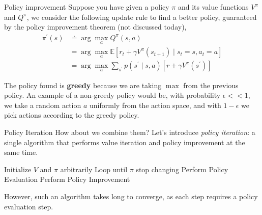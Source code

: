 \documentclass[handout]{beamer}
\begin{document}
\begin{frame}{Policy improvement}
\small
    Suppose you have given a policy $\pi$ and its value functions $V^{\pi}$ and $Q^{\pi}$, we consider the following update rule to find a better policy, guaranteed by the policy improvement theorem (not discussed today), 
    \begin{equation*}
    \begin{aligned}
    \pi^{\prime}(s) & \doteq  \arg \max_{a} Q^{\pi}(s, a) \\
    &=\arg \max_{a} \mathbb{E}\left[r_{t}+\gamma V^{\pi}\left(s_{t+1}\right) \mid s_{t}=s, a_{t}=a\right] \\
    &=\arg \max_{a} \sum_{s^{\prime}} p\left(s^{\prime} \mid s, a\right)\left[r+\gamma V^{\pi}\left(s^{\prime}\right)\right]
    \end{aligned}
    \end{equation*}

    The policy found is \textbf{greedy} because we are taking $\max$ from the previous policy. An example of a non-greedy policy would be, with probability $\epsilon << 1$, we take a random action $a$ uniformly from the action space, and with $1-\epsilon$ we pick actions according to the greedy policy.
\end{frame}

\begin{frame}{Policy Iteration}
How about we combine them? Let's introduce \textit{policy iteration}: a single algorithm that performs value iteration and policy improvement at the same time.
\begin{algorithm}[H]
\caption{Policy Iteration}
Initialize $V$ and $\pi$ arbitrarily\;
Loop until $\pi$ stop changing\;
\quad Perform Policy Evaluation\;
\quad Perform Policy Improvement\;
\end{algorithm}
However, such an algorithm takes long to converge, as each step requires a policy evaluation step. 
\end{frame}
\end{document}
